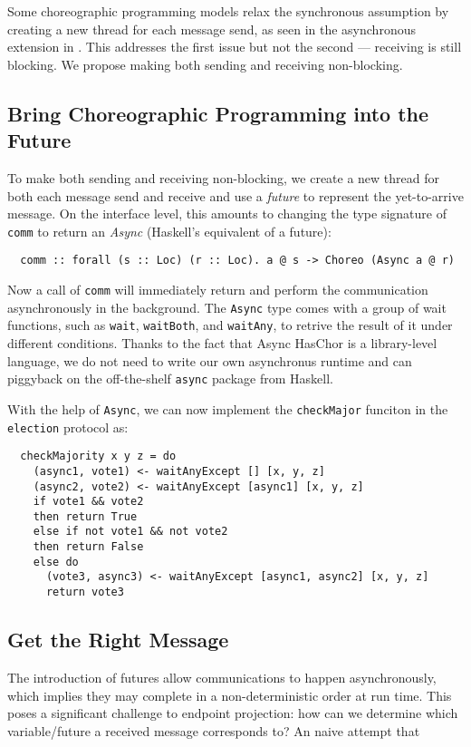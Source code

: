 Some choreographic programming models relax the synchronous assumption by creating a new thread for each message send, as seen in the asynchronous extension in \citet{montesi-textbook}.
%
This addresses the first issue but not the second --- receiving is still blocking.
%
We propose making both sending and receiving non-blocking.

\subsection{Bring Choreographic Programming into the Future}

To make both sending and receiving non-blocking, we create a new thread for both each message send and receive and use a \emph{future} to represent the yet-to-arrive message.
%
On the interface level, this amounts to changing the type signature of \texttt{comm} to return an \emph{Async} (Haskell's equivalent of a future):
%
\begin{verbatim}
  comm :: forall (s :: Loc) (r :: Loc). a @ s -> Choreo (Async a @ r)
\end{verbatim}
%
Now a call of \texttt{comm} will immediately return and perform the communication asynchronously in the background.
%
The \texttt{Async} type comes with a group of wait functions, such as \texttt{wait}, \texttt{waitBoth}, and \texttt{waitAny}, to retrive the result of it under different conditions.
%
Thanks to the fact that Async HasChor is a library-level language, we do not need to write our own asynchronus runtime and can piggyback on the off-the-shelf \texttt{async} package from Haskell.

With the help of \texttt{Async}, we can now implement the \texttt{checkMajor} funciton in the \texttt{election} protocol as:
%
\begin{verbatim}
  checkMajority x y z = do
    (async1, vote1) <- waitAnyExcept [] [x, y, z]  
    (async2, vote2) <- waitAnyExcept [async1] [x, y, z]
    if vote1 && vote2              
    then return True
    else if not vote1 && not vote2
    then return False
    else do                                  
      (vote3, async3) <- waitAnyExcept [async1, async2] [x, y, z]
      return vote3
\end{verbatim}

\subsection{Get the Right Message}

The introduction of futures allow communications to happen asynchronously, which implies they may complete in a non-deterministic order at run time.
%
This poses a significant challenge to endpoint projection: how can we determine which variable/future a received message corresponds to?
%
An naive attempt that 